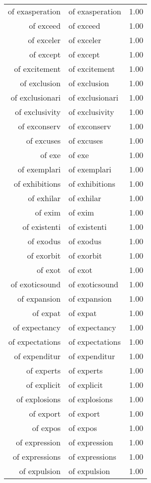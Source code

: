 \begin{table}[ht]
\begin{tabular}{rlr}
  of exasperation & of exasperation & 1.00 \\ 
  of exceed & of exceed & 1.00 \\ 
  of exceler & of exceler & 1.00 \\ 
  of except & of except & 1.00 \\ 
  of excitement & of excitement & 1.00 \\ 
  of exclusion & of exclusion & 1.00 \\ 
  of exclusionari & of exclusionari & 1.00 \\ 
  of exclusivity & of exclusivity & 1.00 \\ 
  of exconserv & of exconserv & 1.00 \\ 
  of excuses & of excuses & 1.00 \\ 
  of exe & of exe & 1.00 \\ 
  of exemplari & of exemplari & 1.00 \\ 
  of exhibitions & of exhibitions & 1.00 \\ 
  of exhilar & of exhilar & 1.00 \\ 
  of exim & of exim & 1.00 \\ 
  of existenti & of existenti & 1.00 \\ 
  of exodus & of exodus & 1.00 \\ 
  of exorbit & of exorbit & 1.00 \\ 
  of exot & of exot & 1.00 \\ 
  of exoticsound & of exoticsound & 1.00 \\ 
  of expansion & of expansion & 1.00 \\ 
  of expat & of expat & 1.00 \\ 
  of expectancy & of expectancy & 1.00 \\ 
  of expectations & of expectations & 1.00 \\ 
  of expenditur & of expenditur & 1.00 \\ 
  of experts & of experts & 1.00 \\ 
  of explicit & of explicit & 1.00 \\ 
  of explosions & of explosions & 1.00 \\ 
  of export & of export & 1.00 \\ 
  of expos & of expos & 1.00 \\ 
  of expression & of expression & 1.00 \\ 
  of expressions & of expressions & 1.00 \\ 
  of expulsion & of expulsion & 1.00 \\ 

\end{tabular}
\end{table}
